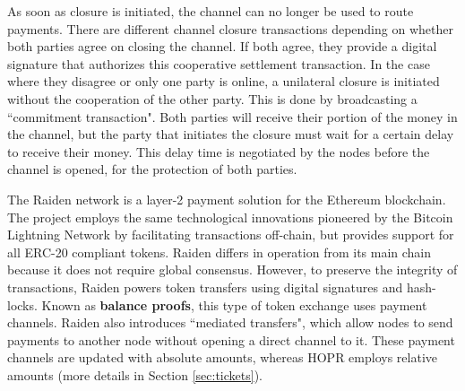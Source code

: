 As soon as closure is initiated, the channel can no longer be used to route payments. There are different channel closure transactions depending on whether both parties agree on closing the channel. If both agree, they provide a digital signature that authorizes this cooperative settlement transaction. In the case where they disagree or only one party is online, a unilateral closure is initiated without the cooperation of the other party. This is done by broadcasting a ``commitment transaction". Both parties will receive their portion of the money in the channel, but the party that initiates the closure must wait for a certain delay to receive their money. This delay time is negotiated by the nodes before the channel is opened, for the protection of both parties.

The Raiden network \cite{raiden} is a layer-2 payment solution for the Ethereum blockchain. The project employs the same technological innovations pioneered by the Bitcoin Lightning Network by facilitating transactions off-chain, but provides support for all ERC-20 compliant tokens. Raiden differs in operation from its main chain because it does not require global consensus. However, to preserve the integrity of transactions, Raiden powers token transfers using digital signatures and hash-locks. Known as \textbf{balance proofs}, this type of token exchange uses payment channels. Raiden also introduces ``mediated transfers", which allow nodes to send payments to another node without opening a direct channel to it. These payment channels are updated with absolute amounts, whereas HOPR employs relative amounts (more details in Section \ref{sec:tickets}).

